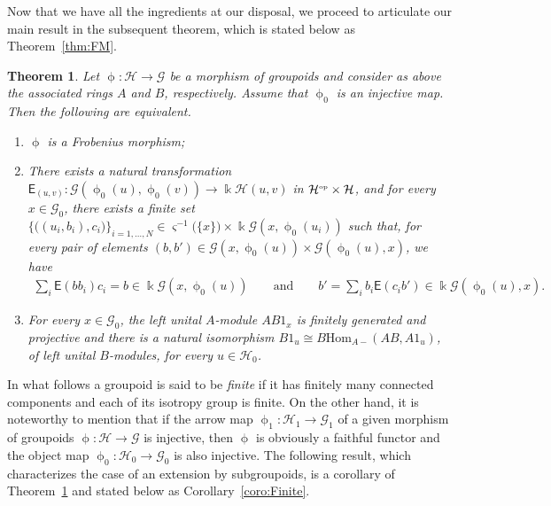 \documentclass[pdftex]{sigma}
\numberwithin{equation}{section}
\newtheorem{Theorem}{Theorem}[section]
\newcommand{\Sf}[1]{\mathsf{#1}}
\renewcommand{\hom}[3]{\mathrm{Hom}_{\Sscript{#1}}\left(#2, #3\right)}
\newcommand{\Go}{\cG_{\Sscript{0}}}
\newcommand{\Ga}{\cG_{\Sscript{1}}}
\newcommand{\Ho}{\cH_{\Sscript{0}}}
\newcommand{\Ha}{\cH_{\Sscript{1}}}
\newcommand{\cG}{{\mathcal G}}
\newcommand{\cH}{{\mathcal H}}
\newcommand{\Sscript}[1]{\scriptscriptstyle{#1}}
\newcommand{\phio}{\upphi_{\Sscript{0}}}
\newcommand{\phia}{\upphi_{\Sscript{1}}}
\begin{document}
Now that we have all the ingredients at our disposal, we proceed to articulate our main result in the subsequent theorem, which is stated below as Theorem~\ref{thm:FM}.

\begin{Theorem}\label{thmA:FM}Let $\upphi\colon \cH \to \cG$ be a morphism of groupoids and consider as above the associated rings $A$ and $B$, respectively. Assume that $\upphi_{\Sscript{0}}$ is an injective map. Then the following are equivalent.
\begin{enumerate}[$(i)$]\itemsep=0pt
\item $\upphi$ is a Frobenius morphism;
\item There exists a natural transformation $\Sf{E}_{\Sscript{(u, v)}}\colon \cG(\phio(u),\phio(v)) \longrightarrow \Bbbk \cH(u,v)$ in $\cH^{\Sscript{\rm op}} \times \cH$, and for every $x \in \Go$, there exists a finite set $\{\big((u_{i},b_{i}), c_{i}\big)\}_{i=1, \dots, N} \in \varsigma^{-1}\big( \{x\}\big)\times \Bbbk \cG(x, \phio(u_{i}))$ such that, for every pair of elements $ (b, b') \in \cG(x, \phio(u)) \times \cG(\phio(u), x)$, we have
\begin{gather*}
\sum_{i}\Sf{E}(bb_{i})c_{i} = b \in \Bbbk \cG(x, \phio(u)) \qquad \text{and} \qquad b' = \sum_{i}b_{i}\Sf{E}(c_{i}b') \in \Bbbk \cG(\phio(u), x).
\end{gather*}
\item For every $x\in \Go$, the left unital $A$-module $AB1_{x}$ is finitely generated and projective and there is a natural isomorphism $B1_{u} \cong B\hom{A-}{AB}{A1_{u}}$, of left
unital $B$-modules, for every $u\in \Ho$.
\end{enumerate}
\end{Theorem}

In what follows a groupoid is said to be \emph{finite} if it has finitely many connected components and each of its isotropy group is finite. On the other hand, it is noteworthy to mention that if the arrow map $\phia\colon \Ha \to \Ga$ of a given morphism of groupoids $\upphi\colon \cH \to \cG$ is injective, then $\upphi$ is obviously a faithful functor and the object map $\phio\colon \Ho \to \Go$ is also injective. The following result, which characterizes the case of an extension by subgroupoids, is a corollary of Theorem~\ref{thmA:FM} and stated below as Corollary~\ref{coro:Finite}.
\end{document}
